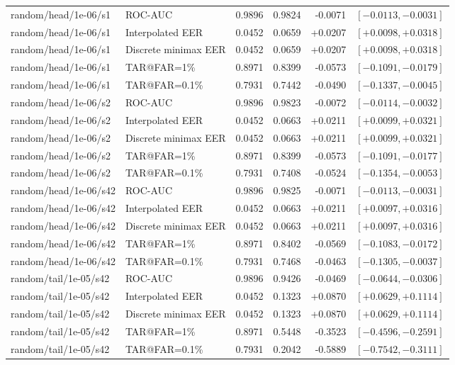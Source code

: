 \begin{table}[!t]
\begin{tabular}{@{}llrrrr@{}}
random/head/1e-06/s1 & ROC-AUC & 0.9896 & 0.9824 & -0.0071 & $[-0.0113,-0.0031]$ \\
random/head/1e-06/s1 & Interpolated EER & 0.0452 & 0.0659 & +0.0207 & $[+0.0098,+0.0318]$ \\
random/head/1e-06/s1 & Discrete minimax EER & 0.0452 & 0.0659 & +0.0207 & $[+0.0098,+0.0318]$ \\
random/head/1e-06/s1 & TAR@FAR=1\% & 0.8971 & 0.8399 & -0.0573 & $[-0.1091,-0.0179]$ \\
random/head/1e-06/s1 & TAR@FAR=0.1\% & 0.7931 & 0.7442 & -0.0490 & $[-0.1337,-0.0045]$ \\
random/head/1e-06/s2 & ROC-AUC & 0.9896 & 0.9823 & -0.0072 & $[-0.0114,-0.0032]$ \\
random/head/1e-06/s2 & Interpolated EER & 0.0452 & 0.0663 & +0.0211 & $[+0.0099,+0.0321]$ \\
random/head/1e-06/s2 & Discrete minimax EER & 0.0452 & 0.0663 & +0.0211 & $[+0.0099,+0.0321]$ \\
random/head/1e-06/s2 & TAR@FAR=1\% & 0.8971 & 0.8399 & -0.0573 & $[-0.1091,-0.0177]$ \\
random/head/1e-06/s2 & TAR@FAR=0.1\% & 0.7931 & 0.7408 & -0.0524 & $[-0.1354,-0.0053]$ \\
random/head/1e-06/s42 & ROC-AUC & 0.9896 & 0.9825 & -0.0071 & $[-0.0113,-0.0031]$ \\
random/head/1e-06/s42 & Interpolated EER & 0.0452 & 0.0663 & +0.0211 & $[+0.0097,+0.0316]$ \\
random/head/1e-06/s42 & Discrete minimax EER & 0.0452 & 0.0663 & +0.0211 & $[+0.0097,+0.0316]$ \\
random/head/1e-06/s42 & TAR@FAR=1\% & 0.8971 & 0.8402 & -0.0569 & $[-0.1083,-0.0172]$ \\
random/head/1e-06/s42 & TAR@FAR=0.1\% & 0.7931 & 0.7468 & -0.0463 & $[-0.1305,-0.0037]$ \\
random/tail/1e-05/s42 & ROC-AUC & 0.9896 & 0.9426 & -0.0469 & $[-0.0644,-0.0306]$ \\
random/tail/1e-05/s42 & Interpolated EER & 0.0452 & 0.1323 & +0.0870 & $[+0.0629,+0.1114]$ \\
random/tail/1e-05/s42 & Discrete minimax EER & 0.0452 & 0.1323 & +0.0870 & $[+0.0629,+0.1114]$ \\
random/tail/1e-05/s42 & TAR@FAR=1\% & 0.8971 & 0.5448 & -0.3523 & $[-0.4596,-0.2591]$ \\
random/tail/1e-05/s42 & TAR@FAR=0.1\% & 0.7931 & 0.2042 & -0.5889 & $[-0.7542,-0.3111]$ \\

\end{tabular}
\end{table}
